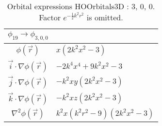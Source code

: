 \begin{table}
\begin{center}
\begin{tabular}{c|l}
$\phi_{19} \rightarrow \phi_{3, 0, 0}$\\
\hline
$\phi(\vec r)$ & $x \left(2 k^{2} x^{2} -3\right)$\\
\hline
$\vec i\cdot \nabla \phi(\vec r)$ & $- 2 k^{4} x^{4} + 9 k^{2} x^{2} -3$\\
$\vec j\cdot \nabla \phi(\vec r)$ & $- k^{2} x y \left(2 k^{2} x^{2} -3\right)$\\
$\vec k\cdot \nabla \phi(\vec r)$ & $- k^{2} x z \left(2 k^{2} x^{2} -3\right)$\\
\hline
$\nabla^2 \phi(\vec r)$ & $k^{2} x \left(k^{2} r^{2} -9\right) \left(2 k^{2} x^{2} -3\right)$\\
\end{tabular}
\caption{Orbital expressions HOOrbitals3D : 3, 0, 0. Factor $e^{- \frac{1}{2} k^{2} r^{2}}$ is omitted.}
\end{center}
\end{table}

\clearpage


